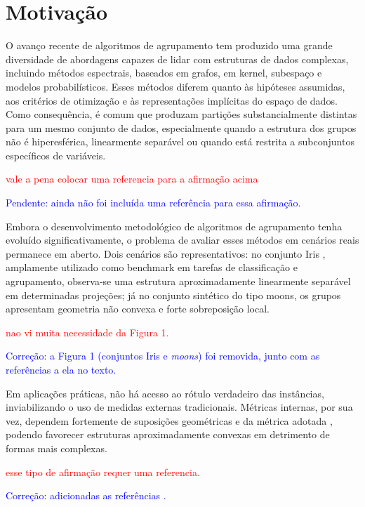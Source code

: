 \section{Motivação}
\label{motivacao}

O avanço recente de algoritmos de agrupamento tem produzido uma grande diversidade de abordagens capazes de lidar com estruturas de dados complexas, incluindo métodos espectrais, baseados em grafos, em kernel, subespaço e modelos probabilísticos. Esses métodos diferem quanto às hipóteses assumidas, aos critérios de otimização e às representações implícitas do espaço de dados. Como consequência, é  comum que produzam partições substancialmente distintas para um mesmo conjunto de dados, especialmente quando a estrutura dos grupos não é hiperesférica, linearmente separável ou quando está restrita a subconjuntos específicos de variáveis.

\textcolor{red}{vale a pena colocar uma referencia para a afirmação acima}

\textcolor{blue}{Pendente: ainda não foi incluída uma referência para essa afirmação.}

Embora o desenvolvimento metodológico de algoritmos de agrupamento tenha evoluído significativamente, o problema de avaliar esses métodos em cenários reais permanece em aberto. Dois cenários são representativos: no conjunto Iris \cite{fisher1936use}, amplamente utilizado como benchmark em tarefas de classificação e agrupamento, observa-se uma estrutura aproximadamente linearmente separável em determinadas projeções; já no conjunto sintético do tipo moons, os grupos apresentam geometria não convexa e forte sobreposição local.

\textcolor{red}{nao vi muita necessidade da Figura 1.}

\textcolor{blue}{Correção: a Figura 1 (conjuntos Iris e \textit{moons}) foi removida, junto com as referências a ela no texto.}

Em aplicações práticas, não há acesso ao rótulo verdadeiro das instâncias, inviabilizando o uso de medidas externas tradicionais. Métricas internas, por sua vez, dependem fortemente de suposições geométricas e da métrica adotada \cite{wu2020decision,WOS:000172252500002,WOS:000232704100004,deborah2010survey}, podendo favorecer estruturas aproximadamente convexas em detrimento de formas mais complexas.

\textcolor{red}{esse tipo de afirmação requer uma referencia.}

\textcolor{blue}{Correção: adicionadas as referências \cite{wu2020decision,WOS:000172252500002,WOS:000232704100004,deborah2010survey}.}

